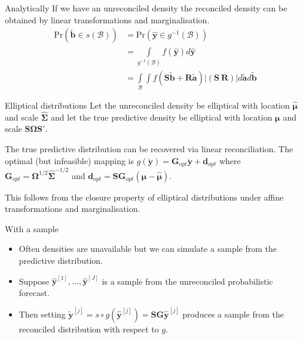 \documentclass{beamer}
\begin{document}
  \begin{frame}{Analytically}
  	If we have an unreconciled density the reconciled density can be obtained by linear transformations and marginalisation.
  	\begin{align*}
  	\mbox{Pr}(\tilde{\bm{b}}\in s(\mathcal{B}))&=\mbox{Pr}(\hat{\bm{y}}\in g^{-1}(\mathcal{B}))\\
  	&=\int\limits_{g^{-1}(\mathcal{B})}f(\hat{\bm{y}})d\hat{\bm{y}}\\
  	&=\int\limits_{\mathcal{B}}\int f(\bm{S}\tilde{\bm{b}}+\bm{R}\tilde{\bm{a}})|\left(\bm{S}~\bm{R}\right)|d\tilde{\bm{a}}d\tilde{\bm{b}}
  	\end{align*}
  \end{frame}
  \begin{frame}{Elliptical distributions}
  	Let the unreconciled density be elliptical with location  $\hat{\bm{\mu}}$ and scale $\hat{\bm{\Sigma}}$ and let the true predictive density be elliptical with location  ${\bm{\mu}}$ and scale ${\bm{S}}{\bm{\Omega}}{\bm{S}}'$.
  	\begin{theorem}
  		The true predictive distribution can be recovered via linear reconciliation.  The optimal (but infeasible) mapping is $g(\breve{\bm y})={\bm G}_{opt}\breve{\bm y}+{\bm d}_{opt}$ where $\bm{G}_{opt}={\bm\Omega}^{1/2}{\bm\hat{\Sigma}}^{-1/2}$ and ${\bm d}_{opt}={\bm S}{\bm G}_{opt}\left({\bm \mu}-\hat{\bm \mu}\right)$.
  	\end{theorem}
    This follows from the closure property of elliptical distributions under affine transformations and marginalisation.
  \end{frame}
  \begin{frame}{With a sample}
  	\begin{itemize}
  		\item Often densities are unavailable but we can simulate a sample from the predictive distribution.
  		\item Suppose $\bm{\hat{y}}^{[1]},\ldots,\bm{\hat{y}}^{[J]}$ is a sample from the unreconciled probabilistic forecast.
  		\item Then setting $\tilde{\bm y}^{[j]}=s\circ g(\hat{\bm y}^{[j]})=\bm{S}\bm{G}\hat{\bm y}^{[j]}$ produces a sample from the reconciled distribution with respect to $g$.
  	\end{itemize}
  \end{frame}
\end{document}
